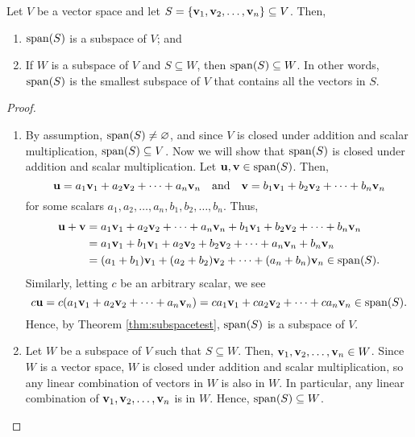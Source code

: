 \begin{thm}
Let $ V $ be a vector space and let $ S=\{\mathbf{v}_1,\mathbf{v}_2,\ldots,\mathbf{v}_n\}\subseteq V $. Then,
\begin{enumerate}
    \item $ \operatorname{span}(S) $ is a subspace of $ V $; and
    \item If $ W $ is a subspace of $ V $ and $ S\subseteq W $, then $ \operatorname{span}(S)\subseteq W $. In other words, $ \operatorname{span}(S) $ is the smallest subspace of $ V $ that contains all the vectors in $ S $.
\end{enumerate}
\end{thm}
\begin{proof}~
\begin{enumerate}
    \item By assumption, $ \operatorname{span}(S)\neq\varnothing $, and since $ V $ is closed under addition and scalar multiplication, $ \operatorname{span}(S)\subseteq V $. Now we will show that $ \operatorname{span}(S) $ is closed under addition and scalar multiplication. Let $ \mathbf{u},\mathbf{v}\in\operatorname{span}(S) $. Then,
    \begin{equation*}
        \mathbf{u}=a_1\mathbf{v}_1+a_2\mathbf{v}_2+\cdots+a_n\mathbf{v}_n \quad\text{and}\quad \mathbf{v}=b_1\mathbf{v}_1+b_2\mathbf{v}_2+\cdots+b_n\mathbf{v}_n
    \end{equation*}
    for some scalars $ a_1,a_2,\ldots,a_n,b_1,b_2,\ldots,b_n $. Thus,
    \begin{align*}
        \mathbf{u}+\mathbf{v} &= a_1\mathbf{v}_1+a_2\mathbf{v}_2+\cdots+a_n\mathbf{v}_n+b_1\mathbf{v}_1+b_2\mathbf{v}_2+\cdots+b_n\mathbf{v}_n \\
        &= a_1\mathbf{v}_1+b_1\mathbf{v}_1+a_2\mathbf{v}_2+b_2\mathbf{v}_2+\cdots+a_n\mathbf{v}_n+b_n\mathbf{v}_n \\
        &= (a_1+b_1)\mathbf{v}_1+(a_2+b_2)\mathbf{v}_2+\cdots+(a_n+b_n)\mathbf{v}_n\in\operatorname{span}(S).
    \end{align*}
    Similarly, letting $ c $ be an arbitrary scalar, we see
    \begin{equation*}
        c\mathbf{u}=c(a_1\mathbf{v}_1+a_2\mathbf{v}_2+\cdots+a_n\mathbf{v}_n)=ca_1\mathbf{v}_1+ca_2\mathbf{v}_2+\cdots+ca_n\mathbf{v}_n\in\operatorname{span}(S).
    \end{equation*}
    Hence, by Theorem \ref{thm:subspacetest}, $ \operatorname{span}(S) $ is a subspace of $ V $.

    \item Let $ W $ be a subspace of $ V $ such that $ S\subseteq W $. Then, $ \mathbf{v}_1,\mathbf{v}_2,\ldots,\mathbf{v}_n\in W $. Since $ W $ is a vector space, $ W $ is closed under addition and scalar multiplication, so any linear combination of vectors in $ W $ is also in $ W $. In particular, any linear combination of $ \mathbf{v}_1,\mathbf{v}_2,\ldots,\mathbf{v}_n $ is in $ W $. Hence, $ \operatorname{span}(S)\subseteq W $.\qedhere
\end{enumerate}
\end{proof}

